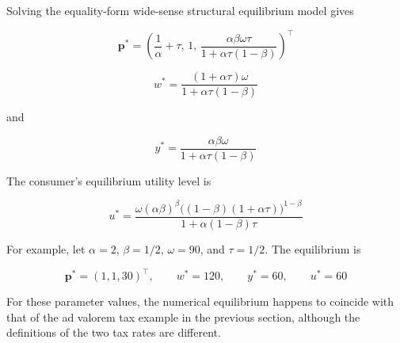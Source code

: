 \documentclass[
  letterpaper,
  DIV=11,
  numbers=noendperiod]{scrreprt}
\begin{document}
Solving the equality-form wide-sense structural equilibrium model gives

\[
\mathbf p^*
=
\left(
\frac{1}{\alpha}+\tau,
\,1,\,
\frac{\alpha\beta\omega\tau}
{1+\alpha\tau(1-\beta)}
\right)^\top
\]

\[
w^*
=
\frac{(1+\alpha\tau)\omega}
{1+\alpha\tau(1-\beta)}
\]

and

\[
y^*
=
\frac{\alpha\beta\omega}
{1+\alpha\tau(1-\beta)}
\]

The consumer's equilibrium utility level is

\[
u^*
=
\frac{
\omega(\alpha\beta)^\beta
\big((1-\beta)(1+\alpha\tau)\big)^{1-\beta}
}{
1+\alpha(1-\beta)\tau
}
\]

For example, let \(\alpha=2\), \(\beta=1/2\), \(\omega=90\), and
\(\tau=1/2\). The equilibrium is

\[
\mathbf p^*=(1,1,30)^\top,\qquad
w^*=120,\qquad
y^*=60,\qquad
u^*=60
\]

For these parameter values, the numerical equilibrium happens to
coincide with that of the ad valorem tax example in the previous
section, although the definitions of the two tax rates are different.
\end{document}
